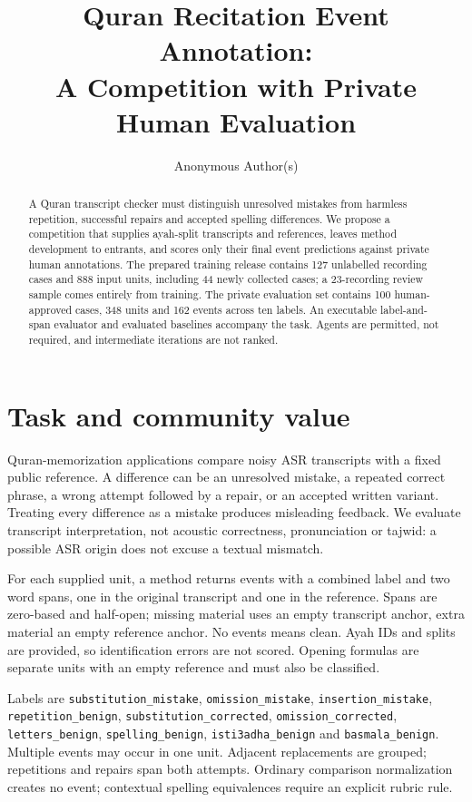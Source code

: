 \documentclass{article}
\title{Quran Recitation Event Annotation:\\A Competition with Private Human Evaluation}
\author{Anonymous Author(s)}
\begin{document}
\maketitle

\begin{abstract}
A Quran transcript checker must distinguish unresolved mistakes from harmless repetition, successful repairs and accepted spelling differences. We propose a competition that supplies ayah-split transcripts and references, leaves method development to entrants, and scores only their final event predictions against private human annotations. The prepared training release contains 127 unlabelled recording cases and 888 input units, including 44 newly collected cases; a 23-recording review sample comes entirely from training. The private evaluation set contains 100 human-approved cases, 348 units and 162 events across ten labels. An executable label-and-span evaluator and evaluated baselines accompany the task. Agents are permitted, not required, and intermediate iterations are not ranked.
\end{abstract}

\section{Task and community value}
Quran-memorization applications compare noisy ASR transcripts with a fixed public reference. A difference can be an unresolved mistake, a repeated correct phrase, a wrong attempt followed by a repair, or an accepted written variant. Treating every difference as a mistake produces misleading feedback. We evaluate transcript interpretation, not acoustic correctness, pronunciation or tajwid: a possible ASR origin does not excuse a textual mismatch.

For each supplied unit, a method returns events with a combined label and two word spans, one in the original transcript and one in the reference. Spans are zero-based and half-open; missing material uses an empty transcript anchor, extra material an empty reference anchor. No events means clean. Ayah IDs and splits are provided, so identification errors are not scored. Opening formulas are separate units with an empty reference and must also be classified.

Labels are \texttt{substitution\_mistake}, \texttt{omission\_mistake}, \texttt{insertion\_mistake}, \texttt{repetition\_benign}, \texttt{substitution\_corrected}, \texttt{omission\_corrected}, \texttt{letters\_benign}, \texttt{spelling\_benign}, \texttt{isti3adha\_benign} and \texttt{basmala\_benign}. Multiple events may occur in one unit. Adjacent replacements are grouped; repetitions and repairs span both attempts. Ordinary comparison normalization creates no event; contextual spelling equivalences require an explicit rubric rule.
\end{document}
